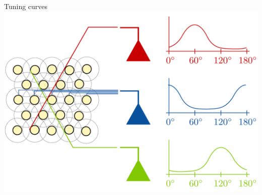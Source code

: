 \documentclass[xcolor=x11names,compress]{beamer}
\renewcommand{\(}{\begin{columns}}
\renewcommand{\)}{\end{columns}}
\newcommand{\<}[1]{\begin{column}{#1}}
\renewcommand{\>}{\end{column}}
\begin{document}
\begin{frame}[t]{Tuning curves}
    \includegraphics[height=0.9\textheight]{receptive_fields}
\end{frame}
\end{document}
